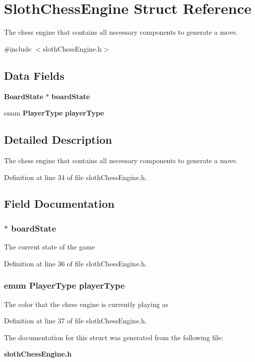 \section{Sloth\+Chess\+Engine Struct Reference}
\label{struct_sloth_chess_engine}


The chess engine that contains all necessary components to generate a move.  




{\ttfamily \#include $<$sloth\+Chess\+Engine.\+h$>$}

\subsection*{Data Fields}
\begin{DoxyCompactItemize}
\item 
{\bf Board\+State} $\ast$ {\bf board\+State}
\item 
enum {\bf Player\+Type} {\bf player\+Type}
\end{DoxyCompactItemize}


\subsection{Detailed Description}
The chess engine that contains all necessary components to generate a move. 

Definition at line 34 of file sloth\+Chess\+Engine.\+h.



\subsection{Field Documentation}
\subsubsection[{board\+State}]{$\ast$ board\+State}\label{struct_sloth_chess_engine_ad3741ae8335da0e4c924b916ebe0530e}
The current state of the game 

Definition at line 36 of file sloth\+Chess\+Engine.\+h.

\subsubsection[{player\+Type}]{\setlength{\rightskip}{0pt plus 5cm}enum {\bf Player\+Type} player\+Type}\label{struct_sloth_chess_engine_a17e3a8637cb7e9daa00961ef6736f74f}
The color that the chess engine is currently playing as 

Definition at line 37 of file sloth\+Chess\+Engine.\+h.



The documentation for this struct was generated from the following file\+:\begin{DoxyCompactItemize}
\item 
{\bf sloth\+Chess\+Engine.\+h}\end{DoxyCompactItemize}
